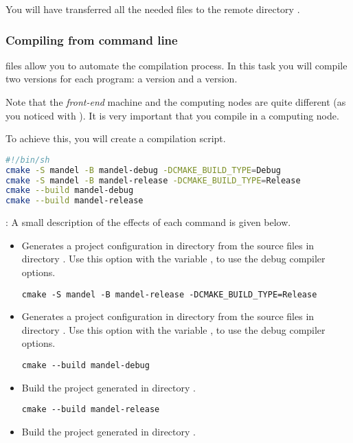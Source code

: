 You will have transferred all the needed files to the remote directory
.

\subsubsection{Compiling from command line}

 files allow you to automate the compilation process.
In this task you will compile two versions for each program:
a  version and a  version.

Note that the \emph{front-end} machine and the computing nodes are quite different
(as you noticed with ).
It is very important that you compile in a computing node.

To achieve this, you will create a compilation script.
\begin{lstlisting}[language=bash,frame=single,title={File: build.sh}]
#!/bin/sh
cmake -S mandel -B mandel-debug -DCMAKE_BUILD_TYPE=Debug
cmake -S mandel -B mandel-release -DCMAKE_BUILD_TYPE=Release
cmake --build mandel-debug
cmake --build mandel-release 
\end{lstlisting}

: 
A small description of the effects of each command is given below.

\begin{itemize}
\begin{lstlisting}[style=terminal]
cmake -S mandel -B mandel-debug -DCMAKE_BUILD_TYPE=Debug
\end{lstlisting}
  \item Generates a project configuration in directory 
        from the source files in directory .
        Use this option with the variable ,
        to use the debug compiler options.

\begin{lstlisting}[style=terminal]
cmake -S mandel -B mandel-release -DCMAKE_BUILD_TYPE=Release
\end{lstlisting}
  \item Generates a project configuration in directory 
        from the source files in directory .
        Use this option with the variable ,
        to use the debug compiler options.

\begin{lstlisting}[style=terminal]
cmake --build mandel-debug
\end{lstlisting}
  \item Build the project generated in directory .

\begin{lstlisting}[style=terminal]
cmake --build mandel-release
\end{lstlisting}
  \item Build the project generated in directory .

\end{itemize}

